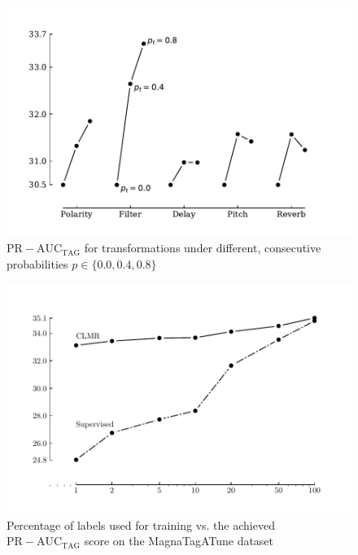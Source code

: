 \begin{figure}[t]
    \centering
    \includegraphics[width=\columnwidth]{figs/transformation_probabilities.pdf}
    \caption{$\mathrm{PR-AUC}_{\mathrm{TAG}}$ for transformations under different, consecutive probabilities $p \in \{ 0.0, 0.4, 0.8 \}$}
    \label{fig:transformation_probabilities}
\end{figure}


\begin{figure}[t]
    \centering
    \includegraphics[width=\columnwidth]{figs/perc_train_data_magnatagatune.pdf}
    \caption{Percentage of labels used for training vs. the achieved $\mathrm{PR-AUC}_{\mathrm{TAG}}$ score on the MagnaTagATune dataset}
    \label{fig:perc_train_data_magnatagatune}
\end{figure}


